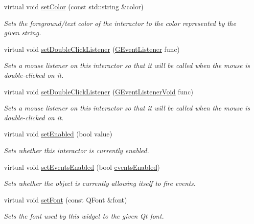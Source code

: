 \begin{DoxyCompactItemize}
virtual void \mbox{\hyperlink{classsgl_1_1GInteractor_a61374df6c11b52cfbb0815decdbaebc6}{set\+Color}} (const std\+::string \&color)
\begin{DoxyCompactList}\small\item\em Sets the foreground/text color of the interactor to the color represented by the given string. \end{DoxyCompactList}\item 
virtual void \mbox{\hyperlink{classsgl_1_1GInteractor_ac29f9a3462458e165fae3a1f046ee77a}{set\+Double\+Click\+Listener}} (\mbox{\hyperlink{namespacesgl_ae9f3e9eab70035da1a2b114e21357b25}{G\+Event\+Listener}} func)
\begin{DoxyCompactList}\small\item\em Sets a mouse listener on this interactor so that it will be called when the mouse is double-\/clicked on it. \end{DoxyCompactList}\item 
virtual void \mbox{\hyperlink{classsgl_1_1GInteractor_a50096194d66f48c92dd4c512d41bfc76}{set\+Double\+Click\+Listener}} (\mbox{\hyperlink{namespacesgl_a54427ce97bb1c2804e4fe2b0a62e8b17}{G\+Event\+Listener\+Void}} func)
\begin{DoxyCompactList}\small\item\em Sets a mouse listener on this interactor so that it will be called when the mouse is double-\/clicked on it. \end{DoxyCompactList}\item 
virtual void \mbox{\hyperlink{classsgl_1_1GInteractor_ab831367dd84bbd579e02e55bacb21343}{set\+Enabled}} (bool value)
\begin{DoxyCompactList}\small\item\em Sets whether this interactor is currently enabled. \end{DoxyCompactList}\item 
virtual void \mbox{\hyperlink{classsgl_1_1GObservable_afaa30b2a9e0f378fd1c70d2f1d0b8216}{set\+Events\+Enabled}} (bool \mbox{\hyperlink{classsgl_1_1GInteractor_a597a370b592e3737d38d9d2f4e2031ea}{events\+Enabled}})
\begin{DoxyCompactList}\small\item\em Sets whether the object is currently allowing itself to fire events. \end{DoxyCompactList}\item 
virtual void \mbox{\hyperlink{classsgl_1_1GInteractor_a2592348886ffea646c6534bf88f7c49d}{set\+Font}} (const Q\+Font \&font)
\begin{DoxyCompactList}\small\item\em Sets the font used by this widget to the given Qt font. \end{DoxyCompactList}\item 

\end{DoxyCompactItemize}
